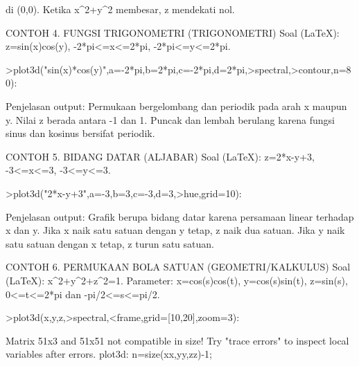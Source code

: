 \documentclass[a4paper,10pt]{article}
\begin{document}
\begin{eulernotebook}
\begin{eulercomment}
di (0,0). Ketika x\textasciicircum{}2+y\textasciicircum{}2 membesar, z mendekati nol.
\end{eulercomment}
\eulersubheading{}
\begin{eulercomment}
CONTOH 4. FUNGSI TRIGONOMETRI (TRIGONOMETRI)
Soal (LaTeX): z=sin(x)cos(y), -2*pi\textless{}=x\textless{}=2*pi,
-2*pi\textless{}=y\textless{}=2*pi.
\end{eulercomment}
\eulersubheading{}
\begin{eulerprompt}
>plot3d("sin(x)*cos(y)",a=-2*pi,b=2*pi,c=-2*pi,d=2*pi,>spectral,>contour,n=80):
\end{eulerprompt}
\begin{eulercomment}
Penjelasan output:
Permukaan bergelombang dan periodik pada arah x maupun y.
Nilai z berada antara -1 dan 1. Puncak dan lembah berulang
karena fungsi sinus dan kosinus bersifat periodik.
\end{eulercomment}
\eulersubheading{}
\begin{eulercomment}
CONTOH 5. BIDANG DATAR (ALJABAR)
Soal (LaTeX): z=2*x-y+3, -3\textless{}=x\textless{}=3, -3\textless{}=y\textless{}=3.
\end{eulercomment}
\eulersubheading{}
\begin{eulerprompt}
>plot3d("2*x-y+3",a=-3,b=3,c=-3,d=3,>hue,grid=10):
\end{eulerprompt}
\begin{eulercomment}
Penjelasan output:
Grafik berupa bidang datar karena persamaan linear terhadap x
dan y. Jika x naik satu satuan dengan y tetap, z naik dua satuan.
Jika y naik satu satuan dengan x tetap, z turun satu satuan.
\end{eulercomment}
\eulersubheading{}
\begin{eulercomment}
CONTOH 6. PERMUKAAN BOLA SATUAN (GEOMETRI/KALKULUS)
Soal (LaTeX): x\textasciicircum{}2+y\textasciicircum{}2+z\textasciicircum{}2=1.
Parameter: x=cos(s)cos(t), y=cos(s)sin(t), z=sin(s),
0\textless{}=t\textless{}=2*pi dan -pi/2\textless{}=s\textless{}=pi/2.
\end{eulercomment}
\eulersubheading{}
\begin{eulerprompt}
>plot3d(x,y,z,>spectral,<frame,grid=[10,20],zoom=3):
\end{eulerprompt}
\begin{euleroutput}
  Matrix 51x3 and 51x51 not compatible in size!
  Try "trace errors" to inspect local variables after errors.
  plot3d:
      n=size(xx,yy,zz)-1;
\end{euleroutput}
\begin{eulercomment}

\end{eulercomment}
\end{eulernotebook}
\end{document}
